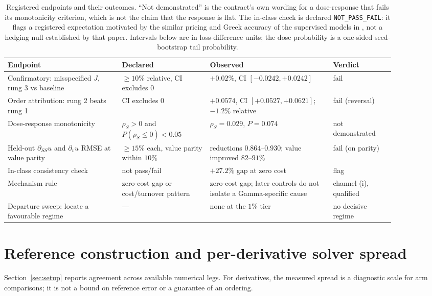 \documentclass{article}
\begin{document}
\begin{table}[!htbp]
\caption{Registered endpoints and their outcomes. ``Not demonstrated'' is the
contract's own wording for a dose-response that fails its monotonicity criterion,
which is not the claim that the response is flat. The in-class check is declared
\texttt{NOT\_PASS\_FAIL}: it flags a registered expectation motivated by the similar
pricing and Greek accuracy of the supervised models in \citet{sakuma2026a},
not a hedging null established by that paper. Intervals below are in loss-difference units;
the dose probability is a one-sided seed-bootstrap tail probability.}
\label{tab:verdicts}
\centering\footnotesize\setlength{\tabcolsep}{4pt}
\begin{tabular}{@{}p{0.26\linewidth}p{0.20\linewidth}p{0.28\linewidth}p{0.14\linewidth}@{}}
\toprule
Endpoint & Declared & Observed & Verdict \\
\midrule
Confirmatory: misspecified $J$, rung 3 vs baseline & $\ge 10\%$ relative, CI excludes 0 & $+0.02\%$, CI $[-0.0242,+0.0242]$ & fail \\
Order attribution: rung 2 beats rung 1 & CI excludes 0 & $+0.0574$, CI $[+0.0527,+0.0621]$; $-1.2\%$ relative & fail (reversal) \\
Dose-response monotonicity & $\rho_S>0$ and $P(\rho_S\le 0)<0.05$ & $\rho_S = 0.029$, $P = 0.074$ & not demonstrated \\
Held-out $\partial_{SS}u$ and $\partial_v u$ RMSE at value parity & $\ge 15\%$ each, value parity within $10\%$ & reductions $0.864$--$0.930$; value improved $82$--$91\%$ & fail (on parity) \\
In-class consistency check & not pass/fail & $+27.2\%$ gap at zero cost & flag \\
Mechanism rule & zero-cost gap or cost/turnover pattern & zero-cost gap; later controls do not isolate a Gamma-specific cause & channel (i), qualified \\
Departure sweep: locate a favourable regime & --- & none at the $1\%$ tier & no decisive regime \\
\bottomrule
\end{tabular}
\end{table}

\section{Reference construction and per-derivative solver spread}
\label{app:oracle}
Section~\ref{sec:setup} reports agreement across available numerical legs.
For derivatives, the measured spread is a diagnostic scale for arm comparisons;
it is not a bound on reference error or a guarantee of an ordering.
\end{document}
